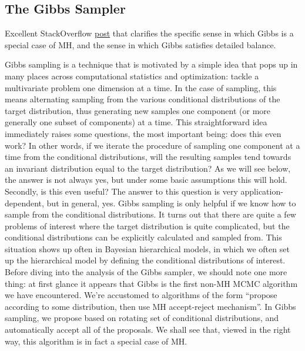\documentclass[12pt]{article}
\begin{document}
\bigskip

\subsection{The Gibbs Sampler}
Excellent StackOverflow \href{https://stats.stackexchange.com/questions/118442/does-the-gibbs-sampling-algorithm-guarantee-detailed-balance#:~:text=You\%20tried\%20to\%20show\%20detailed,detailed\%20balance\%20is\%20not\%20satisfied.}{post} that clarifies the specific sense in which Gibbs is a special case of MH, and the sense in which Gibbs satisfies detailed balance. 

Gibbs sampling is a technique that is motivated by a simple idea that pops up in many places across computational statistics and optimization: tackle a multivariate problem one dimension
at a time. In the case of sampling, this means alternating sampling from the various conditional distributions of the target distribution, thus generating new samples one component (or 
more generally one subset of components) at a time. This straightforward idea immediately raises some questions, the most important being: does this even work? In other words, 
if we iterate the procedure of sampling one component at a time from the conditional distributions, will the resulting samples tend towards an invariant distribution equal to the target 
distribution? As we will see below, the answer is not always yes, but under some basic assumptions this will hold. Secondly, is this even useful? The answer to this question is very 
application-dependent, but in general, yes. Gibbs sampling is only helpful if we know how to sample from the conditional distributions. It turns out that there are quite a few problems
of interest where the target distribution is quite complicated, but the conditional distributions can be explicitly calculated and sampled from. This situation shows up often in Bayesian 
hierarchical models, in which we often set up the hierarchical model by defining the conditional distributions of interest. Before diving into the analysis of the Gibbs sampler, we should note
one more thing: at first glance it appears that Gibbs is the first non-MH MCMC algorithm we have encountered. We're accustomed to algorithms of the form ``propose according to some 
distribution, then use MH accept-reject mechanism''. In Gibbs sampling, we propose based on rotating set of conditional distributions, and automatically accept all of the proposals. We shall 
see that, viewed in the right way, this algorithm is in fact a special case of MH. 
\end{document}
